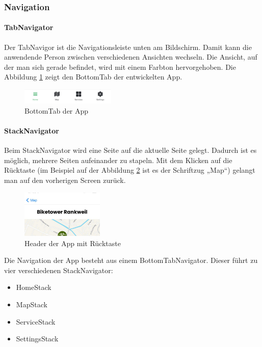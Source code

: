 \subsubsection{Navigation}
\paragraph{TabNavigator} Der TabNavigor ist die Navigationsleiste unten am Bildschirm. Damit kann die anwendende Person zwischen verschiedenen Ansichten wechseln. Die Ansicht, auf der man sich gerade befindet, wird mit einem Farbton hervorgehoben. Die Abbildung \ref{fig:bottomtab} zeigt den BottomTab der entwickelten App.  \\
\begin{figure}[H]
    \centering
    \includegraphics[width=0.4\textwidth]{images/tab.png}
    \caption{BottomTab der App}
    \label{fig:bottomtab}
\end{figure}

\paragraph{StackNavigator}Beim StackNavigator wird eine Seite auf die aktuelle Seite gelegt. Dadurch ist es möglich, mehrere Seiten aufeinander zu stapeln. Mit dem Klicken auf die Rücktaste (im Beispiel auf der Abbildung \ref{fig:appheader} ist es der Schriftzug „Map“) gelangt man auf den vorherigen Screen zurück.  \\
\begin{figure}[H]
    \centering
    \includegraphics[width=0.35\textwidth]{images/appheader.png}
    \caption{Header der App mit Rücktaste}
    \label{fig:appheader}
\end{figure}


Die Navigation der App besteht aus einem BottomTabNavigator. Dieser führt zu vier verschiedenen StackNavigator:\\
\begin{itemize}
    \item HomeStack
    \item MapStack
    \item ServiceStack
    \item SettingsStack
\end{itemize}

